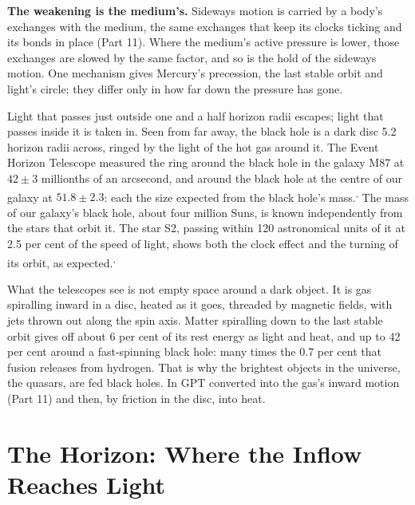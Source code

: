 \documentclass[11pt,a4paper]{article}
\begin{document}
\begin{hypbar}
\textbf{The weakening is the medium's.} Sideways motion is carried by a body's exchanges with the medium, the same exchanges that keep its clocks ticking and its bonds in place (Part 11).\footnotemark{} Where the medium's active pressure is lower, those exchanges are slowed by the same factor, and so is the hold of the sideways motion. One mechanism gives Mercury's precession, the last stable orbit and light's circle; they differ only in how far down the pressure has gone.
\end{hypbar}

 Light that passes just outside one and a half horizon radii escapes; light that passes inside it is taken in. Seen from far away, the black hole is a dark disc 5.2 horizon radii across, ringed by the light of the hot gas around it. The Event Horizon Telescope measured the ring around the black hole in the galaxy M87 at $42\pm3$ millionths of an arcsecond, and around the black hole at the centre of our galaxy at $51.8\pm2.3$: each the size expected from the black hole's mass.\textsuperscript{,} The mass of our galaxy's black hole, about four million Suns, is known independently from the stars that orbit it. The star S2, passing within 120 astronomical units of it at 2.5 per cent of the speed of light, shows both the clock effect and the turning of its orbit, as expected.\textsuperscript{,}

 What the telescopes see is not empty space around a dark object. It is gas spiralling inward in a disc, heated as it goes, threaded by magnetic fields, with jets thrown out along the spin axis. Matter spiralling down to the last stable orbit gives off about 6 per cent of its rest energy as light and heat, and up to 42 per cent around a fast-spinning black hole: many times the 0.7 per cent that fusion releases from hydrogen. That is why the brightest objects in the universe, the quasars, are fed black holes. In GPT  converted into the gas's inward motion (Part 11) and then, by friction in the disc, into heat.

\section{The Horizon: Where the Inflow Reaches Light}
\end{document}

